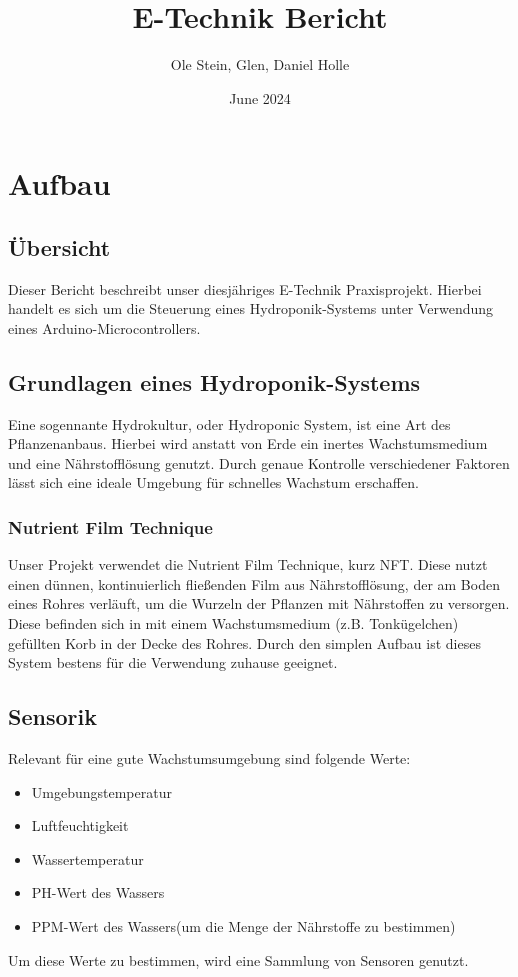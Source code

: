 \documentclass{report}
\title{E-Technik Bericht}
\author{Ole Stein, Glen, Daniel Holle }
\date{June 2024}
\begin{document}
\maketitle

\chapter{Aufbau}

\section{Übersicht}
Dieser Bericht beschreibt unser diesjähriges E-Technik Praxisprojekt. Hierbei handelt es sich um die Steuerung eines Hydroponik-Systems unter Verwendung eines Arduino-Microcontrollers. 

\section{Grundlagen eines Hydroponik-Systems}
Eine sogennante Hydrokultur, oder Hydroponic System, ist eine Art des Pflanzenanbaus. Hierbei wird anstatt von Erde ein inertes Wachstumsmedium und eine Nährstofflösung genutzt. Durch genaue Kontrolle verschiedener Faktoren lässt sich eine ideale Umgebung für schnelles Wachstum erschaffen.
\subsection{Nutrient Film Technique}
Unser Projekt verwendet die Nutrient Film Technique, kurz NFT. Diese nutzt einen dünnen, kontinuierlich fließenden Film aus Nährstofflösung, der am Boden eines Rohres verläuft, um die Wurzeln der Pflanzen mit Nährstoffen zu versorgen. Diese befinden sich in mit einem Wachstumsmedium (z.B. Tonkügelchen) gefüllten Korb in der Decke des Rohres. Durch den simplen Aufbau ist dieses System bestens für die Verwendung zuhause geeignet. 

\section{Sensorik}
Relevant für eine gute Wachstumsumgebung sind folgende Werte:
\begin{itemize}
    \item Umgebungstemperatur
    \item Luftfeuchtigkeit
    \item Wassertemperatur
    \item PH-Wert des Wassers
    \item PPM-Wert des Wassers(um die Menge der Nährstoffe zu bestimmen)
\end{itemize}
Um diese Werte zu bestimmen, wird eine Sammlung von Sensoren genutzt. 
\end{document}
